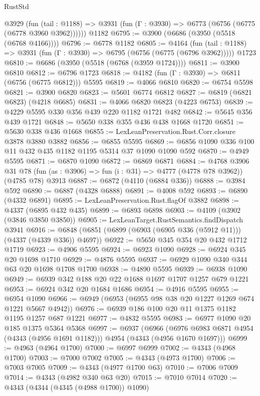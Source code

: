 \begin{lexlean}{RustStd}
\begin{coremodule}
    @3929
      (fun (tail : @1188) => @3931 (fun (Γ : @3930) => @6773 (@6756 (@6775 (@6778 @3960 @3962))))))
    @1182
@6795 := @3900 (@6686 (@3950 (@5518 (@6768 @4166))))
@6796 := @6778 @1182
@6805 := @4164
    (fun (tail : @1188) => @3931 (fun (Γ : @3930) => @6795 (@6756 (@6775 (@6796 @3962)))))
    @1723
@6810 := @6686 (@3950 (@5518 (@6768 (@3959 @1724))))
@6811 := @3900 @6810
@6812 := @6796 @1723
@6818 := @4182 (fun (Γ : @3930) => @6811 (@6756 (@6775 @6812))) @5595
@6819 := @4066 @6810
@6820 := @6754 @5598
@6821 := @3900 @6820
@6823 := @5601 @6774 @6812
@6827 := @6819 (@6821 @6823) (@4218 @6685)
@6831 := @4066 @6820 @6823 (@4223 @6753)
@6839 := @4229 @5595 @330 @356 @439 @220 @1182 @1721 @482
@6842 := @5645 @356 @439 @1721
@6848 := @5650 @338 @355 @436 @438 @1668 @1720
@6851 := @5630 @338 @436 @1668
@6855 := LexLeanPreservation.Rust.Corr.closure @3878 @3880 @3882
@6856 := @6855 @5595
@6869 := @6856 @1090 @336 @100 @11 @432 @435 @1182 @1195 @5314 @37 @1090 @1090 @592
@6870 := @4949 @5595
@6871 := @6870 @1090
@6872 := @6869 @6871
@6884 := @4768
    @3906
    @31
    @78
    (fun (as : @3906) => fun (i : @31) => @4777 (@4778 @78 @3962))
    (@4785 @78)
    @3913
@6887 := @6872 (@4110 (@6884 @336))
@6888 := @3984 @592
@6890 := @6887 (@4328 @6888)
@6891 := @4008 @592
@6893 := @6890 (@4332 @6891)
@6895 := LexLeanPreservation.Rust.flagOf @3882
@6898 := @4337 (@6895 @432 @435)
@6899 := @6893 @6898
@6903 := @4109 (@3902 (@3846 @3850 @3850))
@6905 := LexLeanTarget.RustSemantics.findDispatch @3941
@6916 := @6848 (@6851 (@6899 (@6903 (@6905 @336 (@5912 @11))) (@4337 (@4339 @336)) @4697))
@6922 := @5650 @345 @354 @20 @432 @1712 @1719
@6923 := @4906 @5595
@6924 := @6923 @1090
@6928 := @6924 @345 @20 @1698 @1710
@6929 := @4876 @5595
@6937 := @6929 @1090 @340 @344 @63 @20 @1698 @1708 @1700
@6938 := @4890 @5595
@6939 := @6938 @1090
@6949 := @6939 @342 @188 @20 @22 @1688 @1697 @1707 @1257 @679 @1221
@6953 := @6924 @342 @20 @1684 @1686
@6954 := @4916 @5595
@6955 := @6954 @1090
@6966 := @6949 (@6953 (@6955 @98 @38 @20 @1227 @1269 @674 @1221 @5667 @4942))
@6976 := @6939 @186 @100 @20 @11 @1375 @1182 @1195 @1257 @687 @1221
@6977 := @4832 @5595
@6983 := @6977 @1090 @20 @185 @1375 @5364 @5368
@6997 := @6937
    (@6966 (@6976 @6983 @6871 @4954 (@4343 (@4956 @1691 @1182))) @4954 (@4343 (@4956 @1670 @1697)))
@6999 := @4963 (@4964 @1700)
@7000 := @6997 @6999
@7002 := @4343 (@4968 @1700)
@7003 := @7000 @7002
@7005 := @4343 (@4973 @1700)
@7006 := @7003 @7005
@7009 := @4343 (@4977 @1700 @63)
@7010 := @7006 @7009
@7014 := @4343 (@4982 @340 @63 @20)
@7015 := @7010 @7014
@7020 := @4343 (@4344 (@4345 (@4988 @1700)) @1090)

\end{coremodule}
\end{lexlean}
